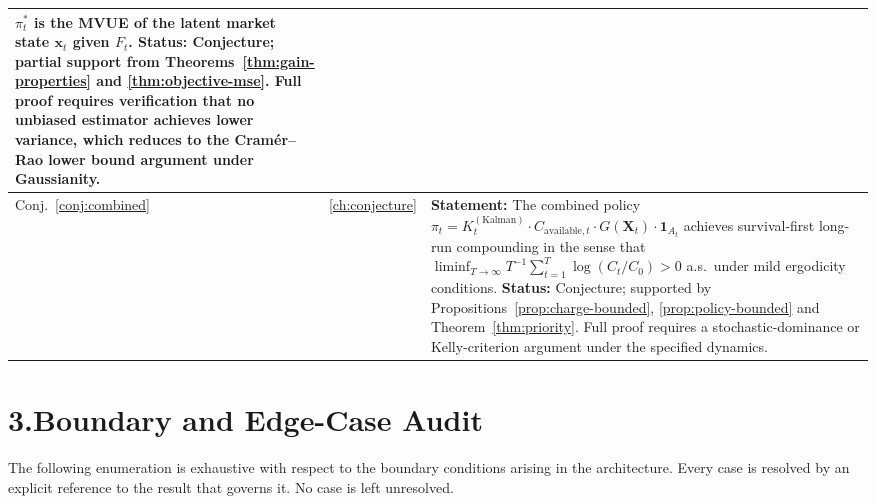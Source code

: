 \documentclass[12pt,openany]{book}
\numberwithin{equation}{chapter}
\theoremstyle{plain}
\theoremstyle{definition}
\theoremstyle{remark}
\def\mathcal#1{#1}%
\begin{document}
\begin{table}[H]
\begin{tabularx}{\linewidth}{@{} l l X @{}}
    $\pi^*_t$ is the MVUE of the latent market state
    $\mathbf{x}_t$ given $\mathcal{F}_t$.
    \newline
    \textbf{Status:} Conjecture; partial support from
    Theorems~\ref{thm:gain-properties} and
    \ref{thm:objective-mse}.  Full proof requires verification
    that no unbiased estimator achieves lower variance, which
    reduces to the Cram\'{e}r--Rao lower bound argument under
    Gaussianity. \\
\midrule
Conj.~\ref{conj:combined}
  & \ref{ch:conjecture}
  & \textbf{Statement:} The combined policy
    $\pi_t = K_t^{(\mathrm{Kalman})}
             \cdot C_{\mathrm{available},t}
             \cdot G(\mathbf{X}_t)
             \cdot \mathbf{1}_{\mathcal{A}_t}$
    achieves survival-first long-run compounding in the sense
    that $\liminf_{T\to\infty} T^{-1}\sum_{t=1}^T
    \log(C_t / C_0) > 0$ a.s.\ under mild ergodicity conditions.
    \newline
    \textbf{Status:} Conjecture; supported by
    Propositions~\ref{prop:charge-bounded},
    \ref{prop:policy-bounded} and
    Theorem~\ref{thm:priority}.  Full proof requires a
    stochastic-dominance or Kelly-criterion argument under the
    specified dynamics. \\
\bottomrule
\end{tabularx}
\end{table}

\section*{3.\enspace Boundary and Edge-Case Audit}

\noindent
The following enumeration is exhaustive with respect to the
boundary conditions arising in the architecture.  Every case
is resolved by an explicit reference to the result that governs it.
No case is left unresolved.
\end{document}
